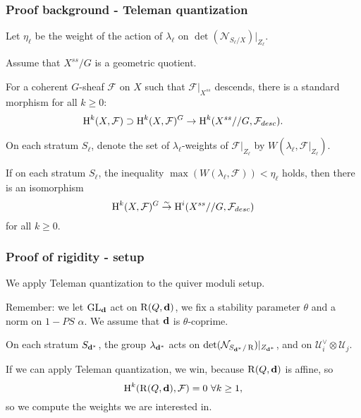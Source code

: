 \documentclass{beamer}
\begin{document}
\begin{frame}
    \frametitle{Proof background - Teleman quantization}
Let $\eta_{\ell}$ be the weight of the action of $\lambda_{\ell}$ on
$\det(\mathcal{N}_{S_{\ell}/X})|_{Z_{\ell}}$. \pause

Assume that $X^{ss}/G$ is a geometric quotient. \pause

For a coherent $G$-sheaf $\mathcal{F}$ on $X$ 
such that $\mathcal{F}|_{X^{ss}}$ descends,
there is a standard morphism for all $k \geq 0$:
\[ \HH^k(X, \mathcal{F}) \supset \HH^{k}(X, \mathcal{F})^{G} \to \HH^{k}(X^{ss} // G, \mathcal{F}_{desc}).\] \pause

On each stratum $S_{\ell}$,
denote the set of $\lambda_{\ell}$-weights of $\mathcal{F}|_{Z_\ell}$
by $W(\lambda_{\ell}, \mathcal{F}|_{Z_\ell})$. \pause
\begin{theorem}

If on each stratum $S_{\ell}$, the inequality $\max(W(\lambda_{\ell}, \mathcal{F})) < \eta_{\ell}$
holds, then there is an isomorphism
\[\HH^{k}(X, \mathcal{F})^{G} \to[\sim] \HH^{i}(X^{ss} // G, \mathcal{F}_{desc})\]
for all $k \geq 0$.
\end{theorem}

\end{frame}

\begin{frame}
    \frametitle{Proof of rigidity - setup}
We apply Teleman quantization to the quiver moduli setup. \pause

Remember: we let $\group$ act on $\parameterspace(Q, \tuple{d})$,
we fix a stability parameter $\theta$ and a norm on $1-PS$ $\alpha$. \pause
We assume that $\tuple{d}$ is $\theta$-coprime.

On each stratum $S_{\tuple{d}^*}$, the group $\lambda_{\tuple{d}^*}$
acts on $\det(\mathcal{N}_{S_{\tuple{d}^*}/\parameterspace})|_{Z_{\tuple{d}^*}}$, \pause
and on $\mathcal{U}^{\vee}_i \otimes \mathcal{U}_j$. \pause

If we can apply Teleman quantization, we win, because $\parameterspace(Q, \tuple{d})$ is affine, so
\[\HH^k(\parameterspace(Q, \tuple{d}), \mathcal{F}) = 0 ~\forall k \geq 1,\]
so we compute the weights we are interested in.
\end{frame}
\end{document}
